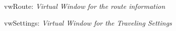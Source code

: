 \begin{figure}[h]
\begin{center}
  \caption{vwRoute: \emph{Virtual Window for the route information}} \label{pic:vwRoute}
\end{center}    
\end{figure}


\begin{figure}[h]
\begin{center}
  \caption{vwSettings: \emph{Virtual Window for the Traveling Settings}} \label{pic:vwSettings}
\end{center}    
\end{figure}

